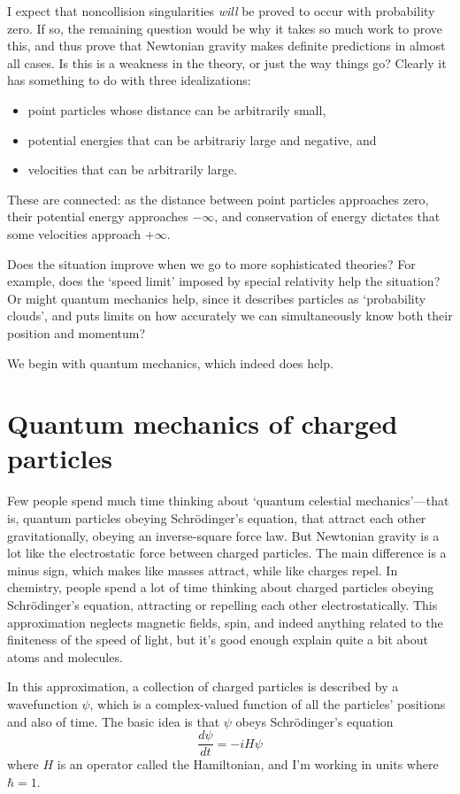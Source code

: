 \documentclass{article}
\begin{document}
I expect that noncollision singularities \emph{will} be proved to occur with probability zero.  If so, the remaining question would be why it takes so much work to prove this, and thus prove that Newtonian gravity makes definite predictions in almost all cases.  Is this is a weakness in the theory, or just the way things go?   Clearly it has something to do with three idealizations:
\begin{itemize} 
\item point particles whose distance can be arbitrarily small,
\item potential energies that can be arbitrariy large and negative, and 
\item velocities that can be arbitrarily large.
\end{itemize}  
These are connected: as the distance between point particles approaches zero, their potential energy approaches $-\infty$, and conservation of energy dictates that some velocities approach $+\infty$.  

Does the situation improve when we go to more sophisticated theories?  For example, does the `speed limit' imposed by special relativity help the situation?  Or might quantum mechanics help, since it describes particles as `probability clouds', and puts limits on how accurately we can simultaneously know both their position and momentum?

We begin with quantum mechanics, which indeed does help.

\section{Quantum mechanics of charged particles}
\label{quantum}

Few people spend much time thinking about `quantum celestial mechanics'---that is, quantum particles obeying Schr\"odinger's equation, that attract each other gravitationally, obeying an inverse-square force law.   But Newtonian gravity is a lot like the electrostatic force between charged particles.  The main difference is a minus sign, which makes like masses attract, while like charges repel.  In chemistry, people spend a lot of time thinking about charged particles obeying Schr\"odinger's equation, attracting or repelling each other electrostatically.  This approximation neglects magnetic fields, spin, and indeed anything related to the finiteness of the speed of light, but it's good enough explain quite a bit about atoms and molecules.

In this approximation, a collection of charged particles is described by a 
wavefunction $\psi$, which is a complex-valued function of all the particles' positions 
and also of time.   The basic idea is that $\psi$ obeys Schr\"odinger's
equation
\[ \frac{d \psi}{dt} = - i H \psi \]
where $H$ is an operator called the Hamiltonian, and I'm working in units where $\hbar = 1$.  
\end{document}
